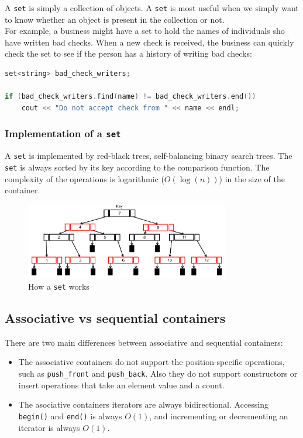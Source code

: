 A \texttt{set} is simply a collection of objects. A \texttt{set} is most useful when we simply
want to know whether an object is present in the collection or not.\\

For example, a business might have a set to hold the names of individuals sho have written
bad checks. When a new check is received, the business can quickly check the set to see if
the person has a history of writing bad checks:\\

\begin{lstlisting}[language=C++]
set<string> bad_check_writers;

if (bad_check_writers.find(name) != bad_check_writers.end())
    cout << "Do not accept check from " << name << endl;
\end{lstlisting}

\subsubsection{Implementation of a \texttt{set}}

A \texttt{set} is implemented by red-black trees, self-balancing binary search trees. The
\texttt{set} is always sorted by its key according to the comparison function. The complexity
of the operations is logarithmic ($O(\log(n))$) in the size of the container.

\begin{figure}[H]
    \centering
    \includegraphics[width=0.8\textwidth]{figures/set.png}
    \caption{How a \texttt{set} works}
    \label{fig:set}
\end{figure}

\subsection{Associative vs sequential containers}

There are two main differences between associative and sequential containers:

\begin{itemize}
    \item The associative containers do not support the position-specific operations, such as
    \texttt{push\_front} and \texttt{push\_back}. Also they do not support constructors or insert
    operations that take an element value and a count.

    \item The asociative containers iterators are always bidirectional. Accessing \texttt{begin()}
    and \texttt{end()} is always $O(1)$, and incrementing or decrementing an iterator is always
    $O(1)$.
\end{itemize}

